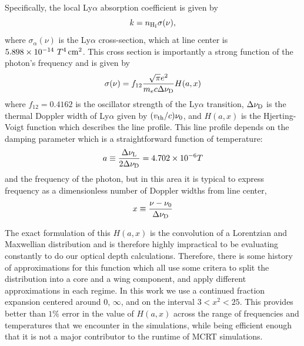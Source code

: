 Specifically, the local Ly$\alpha$ absorption coefficient is given by
\begin{equation}
   \label{eq:kalpaha}
   k = n_{\rm H _I} \sigma(\nu),
\end{equation}
where $\sigma_\alpha(\nu)$ is the Ly$\alpha$ cross-section, which at line center is $5.898\times 10 ^{-14}\ T ^4\,\rm cm^2$.
This cross section is importantly a strong function of the photon's frequency and is given by
\begin{equation}
    \sigma(\nu) = f_{12}\frac{\sqrt{\pi} e^{2}}{m_{e} c \Delta\nu_{\rm{D}}} H(a, x)
\end{equation}
where $f_{12} = 0.4162$ is the oscillator strength of the Ly$\alpha$ transition, $\Delta\nu_{\rm{D}}$ is the thermal Doppler width of Ly$\alpha$ given by $(v_{\rm{th}}/c)\nu_{0}$, and $H(a, x)$ is the Hjerting-Voigt function which describes the line profile.
This line profile depends on the damping parameter which is a straightforward function of temperature:
\begin{equation}
    a \equiv \frac{\Delta \nu_{\rm{L}}}{2\Delta \nu_{\rm{D}}} = 4.702 \times 10^{-6} T
\end{equation}
and the frequency of the photon, but in this area it is typical to express frequency as a dimensionless number of Doppler widths from line center,
\begin{equation}
    x \equiv \frac{\nu - \nu_{0}}{\Delta\nu_{\rm{D}}}
\end{equation}

The exact formulation of this $H(a, x)$ is the convolution of a Lorentzian and Maxwellian distribution and is therefore highly impractical to be evaluating constantly to do our optical depth calculations.
Therefore, there is some history of approximations for this function which all use some critera to split the distribution into a core and a wing component, and apply different approximations in each regime.
In this work we use a continued fraction expansion centered around $0$, $\infty$, and on the interval $3 < x^{2} < 25$.
This provides better than $1\%$ error in the value of $H(a, x)$ across the range of frequencies and temperatures that we encounter in the simulations, while being efficient enough that it is not a major contributor to the runtime of MCRT simulations.

